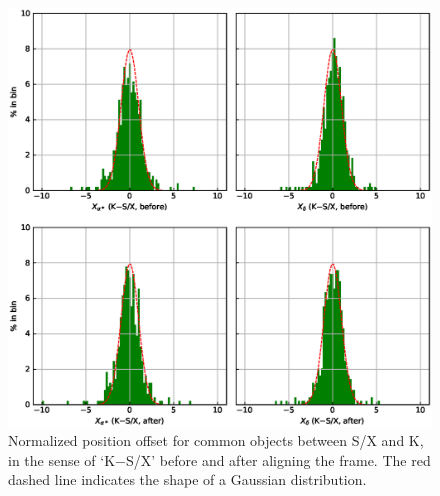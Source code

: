 \documentclass{aa}   %
\begin{document}
\begin{figure}[hbtp]
    \centering
    \includegraphics[width=160mm]{figs/nor-ra-dec-k-sx-hist}
    \caption[]{\label{fig:nor-ra-dec-k-sx-hist}
        Normalized position offset for common objects between S/X and K, in the sense of `K$-$S/X' before and after aligning the frame.
        The red dashed line indicates the shape of a Gaussian distribution.
    }
\end{figure}
\end{document}
